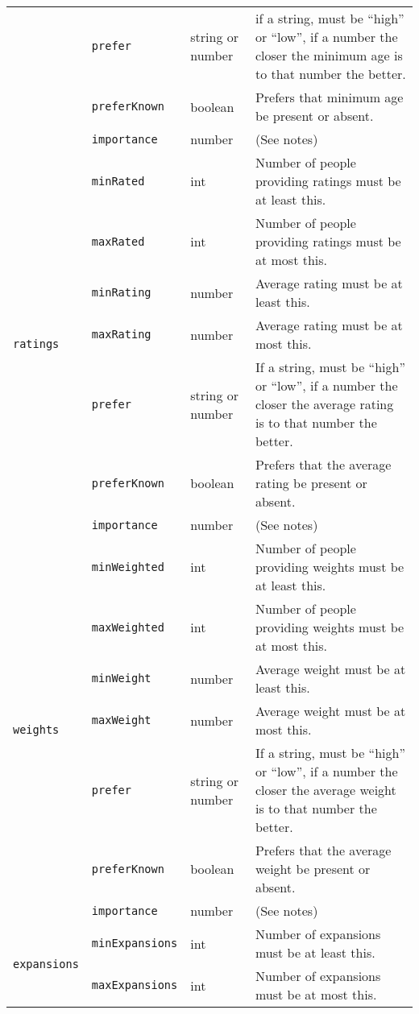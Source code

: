 \documentclass{article}
\newcommand{\code}[1]{\texttt{#1}}
\begin{document}
\begin{longtable}{|l|l|P{.1\textwidth}|P{.55\textwidth}|}
&\code{prefer}&string or number&if a string, must be ``high'' or ``low'', if a number the closer the minimum age is to that number the better.\\*
&\code{preferKnown}&boolean&Prefers that minimum age be present or absent.\footnotemark[3]\\*
&\code{importance}&number&(See notes)\footnotemark[2]\\\hline
\multirow{7}{*}{\code{ratings}\footnotemark[4]}&\code{minRated}&int&Number of people providing ratings must be at least this.\\*
&\code{maxRated}&int&Number of people providing ratings must be at most this.\\*
&\code{minRating}&number&Average rating must be at least this.\\*
&\code{maxRating}&number&Average rating must be at most this.\\*
&\code{prefer}&string or number&If a string, must be ``high'' or ``low'', if a number the closer the average rating is to that number the better.\\*
&\code{preferKnown}&boolean&Prefers that the average rating be present or absent.\footnotemark[3]\\*
&\code{importance}&number&(See notes)\footnotemark[2]\\\hline
\multirow{7}{*}{\code{weights}}&\code{minWeighted}&int&Number of people providing weights must be at least this.\\*
&\code{maxWeighted}&int&Number of people providing weights must be at most this.\\*
&\code{minWeight}&number&Average weight must be at least this.\\*
&\code{maxWeight}&number&Average weight must be at most this.\\*
&\code{prefer}&string or number&If a string, must be ``high'' or ``low'', if a number the closer the average weight is to that number the better.\\*
&\code{preferKnown}&boolean&Prefers that the average weight be present or absent.\footnotemark[3]\\*
&\code{importance}&number&(See notes)\footnotemark[2]\\\hline
\multirow{4}{*}{\code{expansions}}&\code{minExpansions}&int&Number of expansions must be at least this.\\*
&\code{maxExpansions}&int&Number of expansions must be at most this.\\*

\end{longtable}
\end{document}
